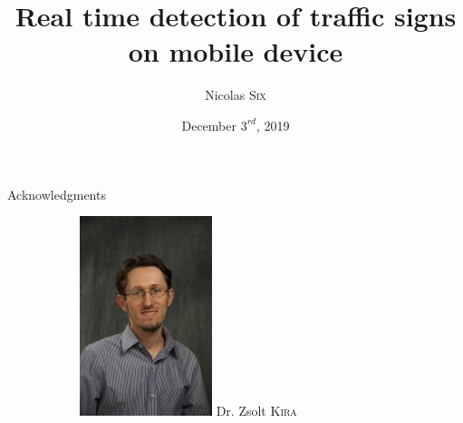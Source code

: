 \documentclass{beamer}
\title[Traffic sign detection on smartphone]{Real time detection of traffic signs on mobile device} %
\author{Nicolas \textsc{Six}} %
\institute[Georgia Institute of Technology] %
{
Georgia Institute of Technology\\%
School of Computer Science
\medskip
}
\date{December $3^{rd}$, 2019} %
\begin{document}
\begin{frame}
\titlepage %
\end{frame}

\begin{frame}{Acknowledgments}
    \begin{figure}
      \begin{center}
        \begin{subfigure}[t]{.3\linewidth}
          \centering
          \includegraphics[height=1.2\linewidth]{figures/comettee/zsoltkira.jpg}
          Dr. Zsolt \textsc{Kira}
        \end{subfigure}
        \begin{subfigure}[t]{.3\linewidth}
          \centering

\end{subfigure}
\end{center}
\end{figure}
\end{frame}
\end{document}
